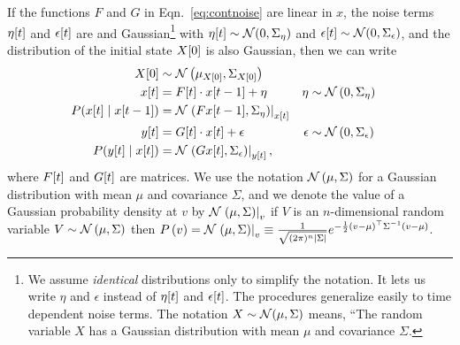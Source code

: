 If the functions $F$ and $G$ in Eqn.~\eqref{eq:contnoise} are linear
in $x$, the noise terms ${\eta}{[t]}$ and ${\epsilon}{[t]}$ are \iid
and Gaussian\footnote{We assume \emph{identical} distributions only to
  simplify the notation.  It lets us write $\eta$ and $\epsilon$
  instead of ${\eta}{[t]}$ and ${\epsilon}{[t]}$.  The procedures
  generalize easily to time dependent noise terms.  The notation
  $X\sim{\mathcal{N}}(\mu,\Sigma)$ means, ``The random variable $X$ has a
  Gaussian distribution with mean $\mu$ and covariance $\Sigma$.} with
${\eta}{[t]} \sim {\mathcal{N}}(0,\Sigma_\eta)$ and
${\epsilon}{[t]} \sim {\mathcal{N}}(0,\Sigma_\epsilon)$, and the
distribution of the initial state ${X}{[0]}$ is also Gaussian, then
we can write
\begin{subequations}
  \label{eq:LinearG}
  \begin{align}
  {X}{[0]} & \sim {\mathcal{N}}\left(\mu_{{X}{[0]}},\Sigma_{{X}{[0]}}
  \right)\\
  {x}{[t]} &= {F}{[t]} \cdot {x}{[t-1]} + \eta &
                                                            \eta &\sim {\mathcal{N}}\left( 0, \Sigma_\eta \right) \\
    P({x}{[t]}\mid {x}{[t-1]}) &=
                                    {\mathcal{N}}\left.\left(F{x}{[t-1]},\Sigma_\eta\right)\right|_{{x}{[t]}} \\
  {y}{[t]} &= {G}{[t]} \cdot {x}{[t]} + \epsilon &
  \epsilon &\sim {\mathcal{N}}\left( 0, \Sigma_\epsilon \right) \\
    P({y}{[t]}\mid {x}{[t]}) &=
                                    {\mathcal{N}}\left.\left(G{x}{[t]},\Sigma_\epsilon\right)\right|_{{y}{[t]}},
  \end{align}
\end{subequations}
where ${F}{[t]}$ and ${G}{[t]}$ are matrices.  We use the notation
${\mathcal{N}}\left( \mu, \Sigma \right)$ for a Gaussian distribution with
mean $\mu$ and covariance $\Sigma$, and we denote the value of a
Gaussian probability density at $v$ by ${\mathcal{N}}\left.\left(\mu,\Sigma\right)\right|_{v}$ \ie
if $V$ is an $n$-dimensional random variable $V \sim {\mathcal{N}}\left( \mu,
  \Sigma \right)$ then $ P\left(v \right) = {\mathcal{N}}\left.\left(\mu,\Sigma\right)\right|_{v}
\equiv \frac{1}{\sqrt{(2\pi)^n \left|\Sigma\right|}} e^{-\frac{1}{2}
  (v-\mu)^\top \Sigma^{-1} (v-\mu)}$.

